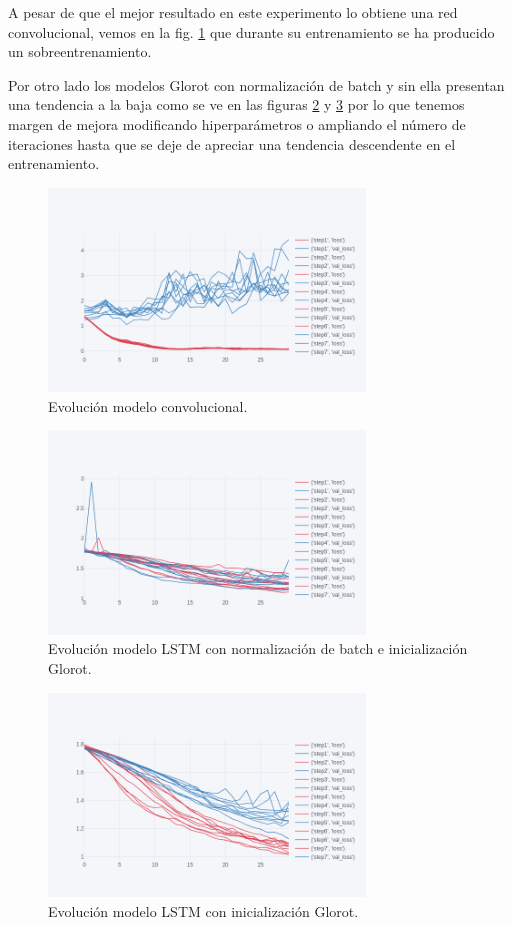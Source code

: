 A pesar de que el mejor resultado en este experimento lo obtiene una red convolucional, vemos en la fig. \ref{conv-5} que durante su entrenamiento se ha producido un sobreentrenamiento.

Por otro lado los modelos Glorot con normalización de batch y sin ella presentan una tendencia a la baja como se ve en las figuras \ref{go-5} y \ref{gn-5} por lo que tenemos margen de mejora modificando hiperparámetros o ampliando el número de iteraciones hasta que se deje de apreciar una tendencia descendente en el entrenamiento.


\begin{figure}[H]
	\centering
	\includegraphics[width=0.75\textwidth]{imaxes/conv-5-clases.png}
	\caption{Evolución modelo convolucional.}
	\label{conv-5}
\end{figure}

\begin{figure}[H]
	\centering
	\includegraphics[width=0.75\textwidth]{imaxes/go.png}
	\caption{Evolución modelo LSTM con normalización de batch e inicialización Glorot.}
	\label{go-5}
\end{figure}

\begin{figure}[H]
	\centering
	\includegraphics[width=0.75\textwidth]{imaxes/gnbn.png}
	\caption{Evolución modelo LSTM con inicialización Glorot.}
	\label{gn-5}
\end{figure}



